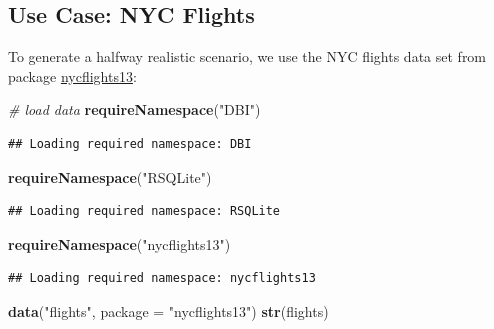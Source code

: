 \documentclass[]{scrbook}
\newenvironment{Shaded}{\begin{snugshade}}{\end{snugshade}}
\newcommand{\CommentTok}[1]{\textcolor[rgb]{0.56,0.35,0.01}{\textit{#1}}}
\newcommand{\DataTypeTok}[1]{\textcolor[rgb]{0.13,0.29,0.53}{#1}}
\newcommand{\KeywordTok}[1]{\textcolor[rgb]{0.13,0.29,0.53}{\textbf{#1}}}
\newcommand{\NormalTok}[1]{#1}
\newcommand{\StringTok}[1]{\textcolor[rgb]{0.31,0.60,0.02}{#1}}
\renewenvironment{Shaded} {\begin{snugshade}\small} {\end{snugshade}}
\begin{document}
\hypertarget{use-case-nyc-flights}{%
\subsection{Use Case: NYC Flights}\label{use-case-nyc-flights}}

To generate a halfway realistic scenario, we use the NYC flights data set from package \href{https://cran.r-project.org/package=nycflights13}{nycflights13}:

\begin{Shaded}
\begin{Highlighting}[]
\CommentTok{# load data}
\KeywordTok{requireNamespace}\NormalTok{(}\StringTok{"DBI"}\NormalTok{)}
\end{Highlighting}
\end{Shaded}

\begin{verbatim}
## Loading required namespace: DBI
\end{verbatim}

\begin{Shaded}
\begin{Highlighting}[]
\KeywordTok{requireNamespace}\NormalTok{(}\StringTok{"RSQLite"}\NormalTok{)}
\end{Highlighting}
\end{Shaded}

\begin{verbatim}
## Loading required namespace: RSQLite
\end{verbatim}

\begin{Shaded}
\begin{Highlighting}[]
\KeywordTok{requireNamespace}\NormalTok{(}\StringTok{"nycflights13"}\NormalTok{)}
\end{Highlighting}
\end{Shaded}

\begin{verbatim}
## Loading required namespace: nycflights13
\end{verbatim}

\begin{Shaded}
\begin{Highlighting}[]
\KeywordTok{data}\NormalTok{(}\StringTok{"flights"}\NormalTok{, }\DataTypeTok{package =} \StringTok{"nycflights13"}\NormalTok{)}
\KeywordTok{str}\NormalTok{(flights)}
\end{Highlighting}
\end{Shaded}
\end{document}

